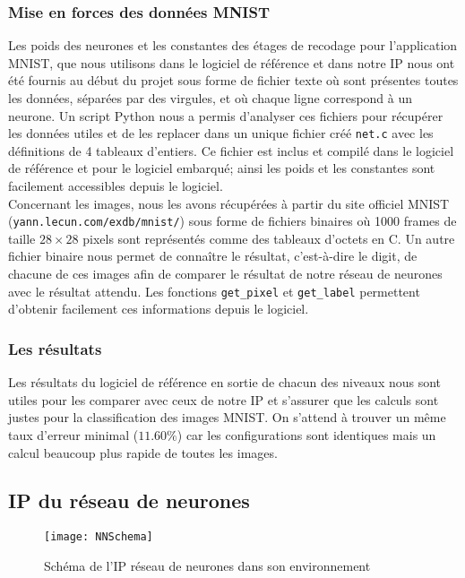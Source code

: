 \subsubsection{Mise en forces des données MNIST}

Les poids des neurones et les constantes des étages de recodage
pour l'application MNIST, que nous utilisons dans
le logiciel de référence et dans notre IP nous ont été fournis au début du projet
sous forme de fichier texte où sont présentes toutes les données, séparées par
des virgules, et où chaque ligne correspond à un neurone. Un script Python nous
a permis d'analyser ces fichiers pour récupérer les données utiles et de les
replacer dans un unique fichier créé \texttt{net.c} avec les définitions de
4 tableaux d'entiers. Ce fichier est inclus et compilé dans le logiciel de référence et
pour le logiciel embarqué; ainsi les poids et les constantes sont
facilement accessibles depuis le logiciel. \\
Concernant les images, nous les avons récupérées à partir du site
officiel MNIST \linebreak (\texttt{yann.lecun.com/exdb/mnist/}) sous forme de fichiers
binaires où 1000 frames de taille $28 \times 28$ pixels sont représentés comme
des tableaux d'octets en C. Un autre fichier binaire nous permet de connaître
le résultat, c'est-à-dire le digit, de chacune de ces images afin de comparer le
résultat de notre réseau de neurones avec le résultat attendu.
Les fonctions \texttt{get\_pixel} et \texttt{get\_label} permettent d'obtenir
facilement ces informations depuis le logiciel.

\subsubsection{Les résultats}

Les résultats du logiciel de référence en sortie de chacun des niveaux nous
sont utiles pour les comparer avec ceux de notre IP et s'assurer que les calculs
sont justes pour la classification des images MNIST. On s'attend à trouver
un même taux d'erreur minimal ($11.60\%$) car les configurations sont identiques
mais un calcul beaucoup plus rapide de toutes les images.

\subsection{IP du réseau de neurones}

\begin{figure}[h!]
    \begin{center}
    	\texttt{[image: NNSchema]}
    	\label{fig:NNSchema}
    	\caption{Schéma de l'IP réseau de neurones dans son environnement }
    \end{center}
\end{figure}

